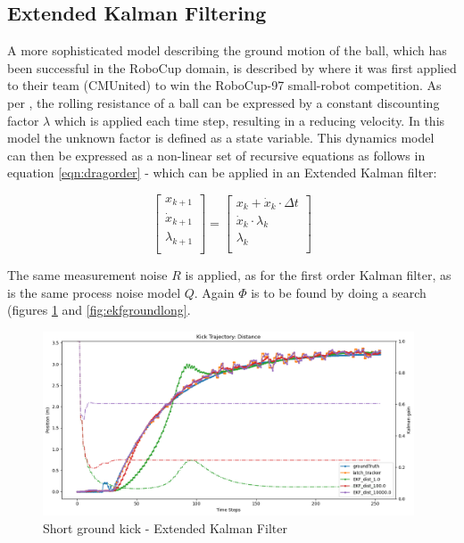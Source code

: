 \documentclass[a4paper,twoside,12pt]{report}
\begin{document}
\subsection{Extended Kalman Filtering}

A more sophisticated model describing the ground motion of the ball, which has been successful in the RoboCup domain, is described by \cite{kalmanmodel} where it was first applied to their team (CMUnited) to win the RoboCup-97 small-robot competition. As per \cite{kalmanmodel}, the rolling resistance of a ball can be expressed by a constant discounting factor $\lambda$ which is applied each time step, resulting in a reducing velocity. In this model the unknown factor is defined as a state variable. This dynamics model can then be expressed as a non-linear set of recursive equations as follows in equation \ref{eqn:dragorder} - which can be applied in an Extended Kalman filter:

\begin{equation} 
\begin{bmatrix}
    x_{k+1} \\
    \dot{x}_{k+1} \\
	\lambda_{k+1} \\
\end{bmatrix}
=
\begin{bmatrix}
    x_{k} + \dot{x}_{k} \cdot \Delta t\\
    \dot{x}_{k} \cdot \lambda_{k} \\
	\lambda_{k} \\
\end{bmatrix}
\label{eqn:dragorder}
\end{equation}

The same measurement noise $R$ is applied, as for the first order Kalman filter, as is the same process noise model $Q$. Again $\Phi$ is to be found by doing a search (figures \ref{fig:ekfgroundshort} and \ref{fig:ekfgroundlong}.

\begin{figure}[h!]
\begin{center}
\includegraphics[width=11cm]{images/ekf_ground_short.png}
\caption{Short ground kick - Extended Kalman Filter}
\label{fig:ekfgroundshort}
\end{center}
\end{figure}
\end{document}
